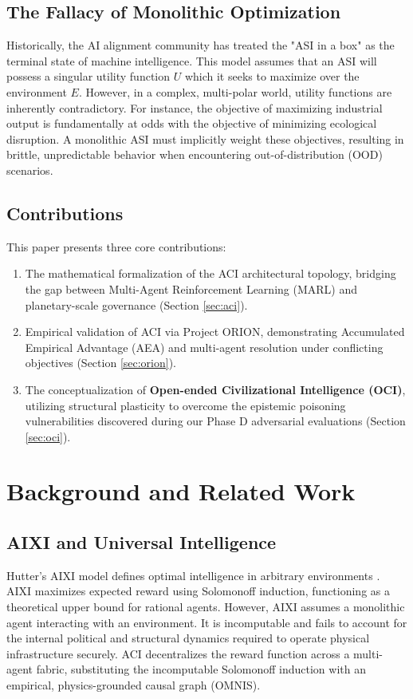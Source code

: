 \documentclass[12pt,a4paper]{article}
\begin{document}
\subsection{The Fallacy of Monolithic Optimization}
Historically, the AI alignment community has treated the "ASI in a box" as the terminal state of machine intelligence. This model assumes that an ASI will possess a singular utility function $U$ which it seeks to maximize over the environment $E$. However, in a complex, multi-polar world, utility functions are inherently contradictory. For instance, the objective of maximizing industrial output is fundamentally at odds with the objective of minimizing ecological disruption. A monolithic ASI must implicitly weight these objectives, resulting in brittle, unpredictable behavior when encountering out-of-distribution (OOD) scenarios.

\subsection{Contributions}
This paper presents three core contributions:
\begin{enumerate}
    \item The mathematical formalization of the ACI architectural topology, bridging the gap between Multi-Agent Reinforcement Learning (MARL) and planetary-scale governance (Section \ref{sec:aci}).
    \item Empirical validation of ACI via Project ORION, demonstrating Accumulated Empirical Advantage (AEA) and multi-agent resolution under conflicting objectives (Section \ref{sec:orion}).
    \item The conceptualization of \textbf{Open-ended Civilizational Intelligence (OCI)}, utilizing structural plasticity to overcome the epistemic poisoning vulnerabilities discovered during our Phase D adversarial evaluations (Section \ref{sec:oci}).
\end{enumerate}

\section{Background and Related Work}
\label{sec:background}

\subsection{AIXI and Universal Intelligence}
Hutter's AIXI model defines optimal intelligence in arbitrary environments \cite{hutter2004universal}. AIXI maximizes expected reward using Solomonoff induction, functioning as a theoretical upper bound for rational agents. However, AIXI assumes a monolithic agent interacting with an environment. It is incomputable and fails to account for the internal political and structural dynamics required to operate physical infrastructure securely. ACI decentralizes the reward function across a multi-agent fabric, substituting the incomputable Solomonoff induction with an empirical, physics-grounded causal graph (OMNIS).
\end{document}
